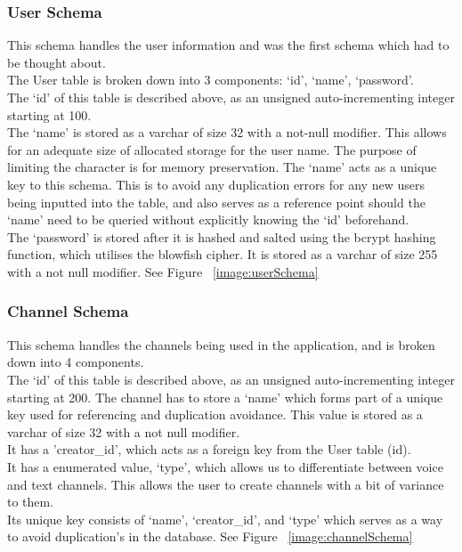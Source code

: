 \subsubsection{User Schema}
This schema handles the user information and was the first schema which had to be thought about.
\\ The User table is broken down into 3 components: ‘id’, ‘name’, ‘password’.
\\The ‘id’ of this table is described above, as an unsigned auto-incrementing integer starting at 100.
\\The ‘name’ is stored as a varchar of size 32 with a not-null modifier. This allows for an adequate size of allocated storage for the user name. The purpose of limiting the character is for memory preservation. The ‘name’ acts as a unique key to this schema. This is to avoid any duplication errors for any new users being inputted into the table, and also serves as a reference point should the ‘name’ need to be queried without explicitly knowing the ‘id’ beforehand. 
\\The ‘password’ is stored after it is hashed and salted using the bcrypt hashing function, which utilises the blowfish cipher. It is stored as a varchar of size 255 with a not null modifier.
See Figure ~\ref{image:userSchema}

\subsubsection{Channel Schema}
This schema handles the channels being used in the application, and is broken down into 4 components.
\\The ‘id’ of this table is described above, as an unsigned auto-incrementing integer starting at 200.
The channel has to store a ‘name’ which forms part of a unique key used for referencing and duplication avoidance. This value is stored as a varchar of size 32 with a not null modifier.
\\It has a 'creator\_id', which acts as a foreign key from the User table (id).
\\It has a enumerated value, ‘type’, which allows us to differentiate between voice and text channels. This allows the user to create channels with a bit of variance to them.
\\Its unique key consists of ‘name’, ‘creator\_id’, and ‘type’ which serves as a way to avoid duplication's in the database.
See Figure ~\ref{image:channelSchema}

